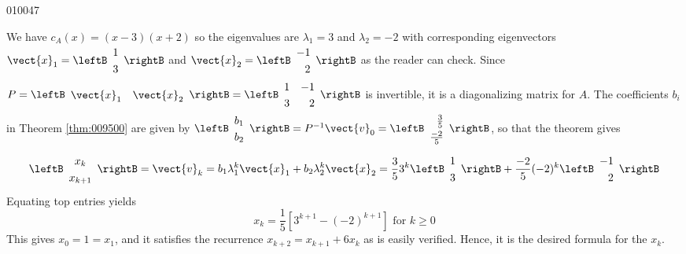 \begin{example}{}{010047}
\begin{solution}
We have $c_{A}(x) = (x -3)(x + 2)$ so the eigenvalues are $\lambda_{1} = 3$ and $\lambda_{2} = -2$ with corresponding eigenvectors $\vect{x}_1 = \leftB \begin{array}{c}
1\\
3
\end{array}\rightB$
 and $\vect{x}_2 = \leftB \begin{array}{r}
-1\\
2
\end{array}\rightB$
 as the reader can check. Since $P = \leftB \begin{array}{cc}
\vect{x}_1 & \vect{x}_2 
\end{array}\rightB = \leftB \begin{array}{rr}
1 & -1 \\
3 & 2 
\end{array} \rightB$
 is invertible, it is a diagonalizing matrix for $A$. The coefficients $b_{i}$ in Theorem \ref{thm:009500} are given by $ \leftB \begin{array}{c}
b_1 \\
b_2 
\end{array} \rightB = P^{-1} \vect{v}_0 = \leftB \def\arraystretch{1.25}\begin{array}{r}
\frac{3}{5} \\
\frac{-2}{5}
\end{array}\rightB$, so that the theorem gives
\begin{equation*}
\leftB \begin{array}{c}
x_k \\
x_{k+1} 
\end{array}\rightB = \vect{v}_k = b_1 \lambda_1^k \vect{x}_1 + b_2 \lambda_2^k \vect{x}_2 = \frac{3}{5} 3^k \leftB \begin{array}{c}
1 \\
3
\end{array}\rightB + \frac{-2}{5} (-2)^k \leftB \begin{array}{r}
-1 \\
2
\end{array}\rightB
\end{equation*}
Equating top entries yields
\begin{equation*}
x_k = \frac{1}{5} \left[ 3^{k+1} - (-2)^{k+1} \right] \mbox{ for } k \geq 0
\end{equation*}
This gives $x_{0} = 1 = x_{1}$, and it satisfies the recurrence $x_{k+2} = x_{k+1} + 6x_{k}$ as is easily verified. Hence, it is the desired formula for the $x_{k}$.
\end{solution}
\end{example}

